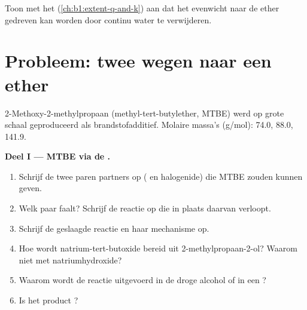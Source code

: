 \begin{exercise}[$\star\star\star$]\label{exo:b1:alcohol-activation:12}
Toon met het  (\cref{ch:b1:extent-q-and-k}) aan dat het
evenwicht  naar de ether gedreven kan
worden door continu water te verwijderen.
\end{exercise}

\section{Probleem: twee wegen naar een ether}

\begin{problem}
\label{pb:b1:alcohol-activation:1}
2-Methoxy-2-methylpropaan (methyl-tert-butylether, MTBE) werd op grote
schaal geproduceerd als brandstofadditief. Molaire massa's (\unit{g/mol}):
 74.0,  88.0,  141.9.

\medskip
\noindent\textbf{Deel I --- MTBE via de .}
\begin{enumerate}
  \item Schrijf de twee paren partners op ( en halogenide) die
        MTBE zouden kunnen geven.
  \item Welk paar faalt? Schrijf de reactie op die in plaats daarvan
        verloopt.
  \item Schrijf de geslaagde reactie en haar mechanisme op.
  \item Hoe wordt natrium-tert-butoxide bereid uit 2-methylpropaan-2-ol?
        Waarom niet met natriumhydroxide?
  \item Waarom wordt de reactie uitgevoerd in de droge alcohol of in een
        ?
  \item Is het product ?
\end{enumerate}


\end{problem}
